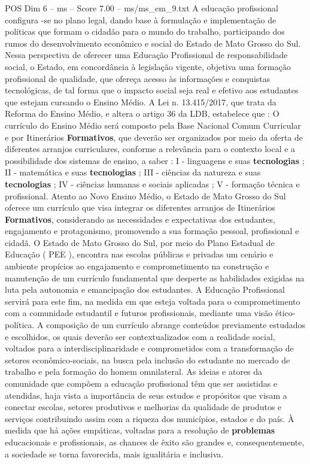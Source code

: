 \begin{textsample}{POS Dim 6 – ms – Score 7.00 – ms/ms\_em\_9.txt}
A educação profissional configura -se no plano legal, dando base à formulação e implementação de políticas que formam o cidadão para o mundo do trabalho, participando dos rumos do desenvolvimento econômico e social do Estado de Mato Grosso do Sul.
Nessa perspectiva de oferecer uma Educação Profissional de responsabilidade social, o Estado, em concordância à legislação vigente, objetiva uma formação profissional de qualidade, que ofereça acesso às informações e conquistas tecnológicas, de tal forma que o impacto social seja real e efetivo aos estudantes que estejam cursando o Ensino Médio.
A Lei n. 13.415/2017, que trata da Reforma do Ensino Médio, e altera o artigo 36 da LDB, estabelece que : O currículo do Ensino Médio será composto pela Base Nacional Comum Curricular e por Itinerários \textbf{Formativos}, que deverão ser organizados por meio da oferta de diferentes arranjos curriculares, conforme a relevância para o contexto local e a possibilidade dos sistemas de ensino, a saber : I - linguagens e suas \textbf{tecnologias} ; II - matemática e suas \textbf{tecnologias} ; III - ciências da natureza e suas \textbf{tecnologias} ; IV - ciências humanas e sociais aplicadas ; V - formação técnica e profissional.
Atento ao Novo Ensino Médio, o Estado de Mato Grosso do Sul oferece um currículo que visa integrar os diferentes arranjos de Itinerários \textbf{Formativos}, considerando as necessidades e expectativas dos estudantes, engajamento e protagonismo, promovendo a sua formação pessoal, profissional e cidadã.
O Estado de Mato Grosso do Sul, por meio do Plano Estadual de Educação ( PEE ), encontra nas escolas públicas e privadas um cenário e ambiente propícios ao engajamento e comprometimento na construção e manutenção de um currículo fundamental que desperte as habilidades exigidas na luta pela autonomia e emancipação dos estudantes.
A Educação Profissional servirá para este fim, na medida em que esteja voltada para o comprometimento com a comunidade estudantil e futuros profissionais, mediante uma visão ético-política.
A composição de um currículo abrange conteúdos previamente estudados e escolhidos, os quais deverão ser contextualizados com a realidade social, voltados para a interdisciplinaridade e comprometidos com a transformação de setores econômico-sociais, na busca pela inclusão do estudante no mercado de trabalho e pela formação do homem omnilateral.
As ideias e atores da comunidade que compõem a educação profissional têm que ser assistidas e atendidas, haja vista a importância de seus estudos e propósitos que visam a conectar escolas, setores produtivos e melhorias da qualidade de produtos e serviços contribuindo assim com a riqueza dos municípios, estados e do país.
À medida que há ações empáticas, voltadas para a resolução de \textbf{problemas} educacionais e profissionais, as chances de êxito são grandes e, consequentemente, a sociedade se torna favorecida, mais igualitária e inclusiva.

\end{textsample}
